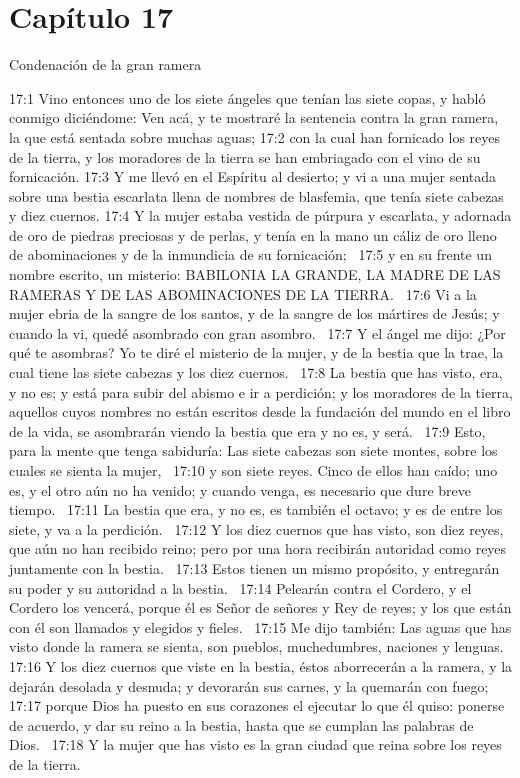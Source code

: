 \section*{Capítulo 17 }
Condenación de la gran ramera  

17:1 Vino entonces uno de los siete ángeles que tenían las siete copas, y habló conmigo diciéndome: Ven acá, y te mostraré la sentencia contra la gran ramera, la que está sentada sobre muchas aguas; 
17:2 con la cual han fornicado los reyes de la tierra, y los moradores de la tierra se han embriagado con el vino de su fornicación. 
17:3 Y me llevó en el Espíritu al desierto; y vi a una mujer sentada sobre una bestia escarlata llena de nombres de blasfemia, que tenía siete cabezas y diez cuernos. 
17:4 Y la mujer estaba vestida de púrpura y escarlata, y adornada de oro de piedras preciosas y de perlas, y tenía en la mano un cáliz de oro lleno de abominaciones y de la inmundicia de su fornicación;  
17:5 y en su frente un nombre escrito, un misterio: BABILONIA LA GRANDE, LA MADRE DE LAS RAMERAS Y DE LAS ABOMINACIONES DE LA TIERRA.  
17:6 Vi a la mujer ebria de la sangre de los santos, y de la sangre de los mártires de Jesús; y cuando la vi, quedé asombrado con gran asombro.  
17:7 Y el ángel me dijo: ¿Por qué te asombras? Yo te diré el misterio de la mujer, y de la bestia que la trae, la cual tiene las siete cabezas y los diez cuernos.  
17:8 La bestia que has visto, era, y no es; y está para subir del abismo e ir a perdición; y los moradores de la tierra, aquellos cuyos nombres no están escritos desde la fundación del mundo en el libro de la vida, se asombrarán viendo la bestia que era y no es, y será.  
17:9 Esto, para la mente que tenga sabiduría: Las siete cabezas son siete montes, sobre los cuales se sienta la mujer,  
17:10 y son siete reyes. Cinco de ellos han caído; uno es, y el otro aún no ha venido; y cuando venga, es necesario que dure breve tiempo.  
17:11 La bestia que era, y no es, es también el octavo; y es de entre los siete, y va a la perdición.  
17:12 Y los diez cuernos que has visto, son diez reyes, que aún no han recibido reino; pero por una hora recibirán autoridad como reyes juntamente con la bestia.  
17:13 Estos tienen un mismo propósito, y entregarán su poder y su autoridad a la bestia.  
17:14 Pelearán contra el Cordero, y el Cordero los vencerá, porque él es Señor de señores y Rey de reyes; y los que están con él son llamados y elegidos y fieles.  
17:15 Me dijo también: Las aguas que has visto donde la ramera se sienta, son pueblos, muchedumbres, naciones y lenguas.  
17:16 Y los diez cuernos que viste en la bestia, éstos aborrecerán a la ramera, y la dejarán desolada y desnuda; y devorarán sus carnes, y la quemarán con fuego;  
17:17 porque Dios ha puesto en sus corazones el ejecutar lo que él quiso: ponerse de acuerdo, y dar su reino a la bestia, hasta que se cumplan las palabras de Dios.  
17:18 Y la mujer que has visto es la gran ciudad que reina sobre los reyes de la tierra.  
